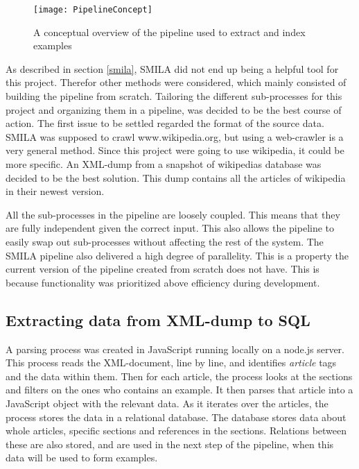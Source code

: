 
\begin{figure}[h]
\caption{A conceptual overview of the pipeline used to extract and index examples}
\texttt{[image: PipelineConcept]}
\end{figure}



As described in section \ref{smila}, SMILA did not end up being a helpful tool for this project. Therefor other methods were considered, which mainly consisted of building the pipeline from scratch. Tailoring the different sub-processes for this project and organizing them in a pipeline, was decided to be the best course of action. The first issue to be settled regarded the format of the source data. SMILA was supposed to crawl www.wikipedia.org, but using a web-crawler is a very general method. Since this project were going to use wikipedia, it could be more specific. An XML-dump from a snapshot of wikipedias database was decided to be the best solution. This dump contains all the articles of wikipedia in their newest version.


All the sub-processes in the pipeline are loosely coupled. This means that they are fully independent given the correct input. This also allows the pipeline to easily swap out sub-processes without affecting the rest of the system. The SMILA pipeline also delivered a high degree of parallelity. This is a property the current version of the pipeline created from scratch does not have. This is because functionality was prioritized above efficiency during development. 

\subsection{Extracting data from XML-dump to SQL}

A parsing process was created in JavaScript running locally on a node.js server. This process reads the XML-document, line by line, and identifies \textit{article} tags and the data within them. Then for each article, the process looks at the sections and filters on the ones who contains an example. It then parses that article into a JavaScript object with the relevant data. As it iterates over the articles, the process stores the data in a relational database. The database stores data about whole articles, specific sections and references in the sections. Relations between these are also stored, and are used in the next step of the pipeline, when this data will be used to form examples. 

